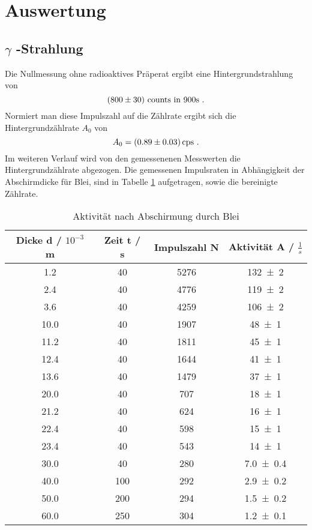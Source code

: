 \section{Auswertung}
\label{sec:Auswertung}
\subsection{\texorpdfstring{$\gamma$ -Strahlung }%
                               {gamma -Strahlung}}
Die Nullmessung ohne radioaktives Präperat ergibt eine Hintergrundstrahlung von
\begin{equation}
  (\num{800 +- 30}) \text{ counts in } 900 \text{s} \ .
  \label{eqn:gammacoun}
\end{equation}
Normiert man diese Impulszahl auf die Zählrate ergibt sich die Hintergrundzählrate $A_0$ von
\begin{equation}
  A_0 = (\num{0.89 +- 0.03}) \, \text{cps} \ .
  \label{eqn:A0}
\end{equation}
Im weiteren Verlauf wird von den gemessenenen Messwerten die Hintergrundzählrate abgezogen. Die gemessenen Impulsraten in Abhängigkeit der Abschirmdicke für Blei, sind in Tabelle \ref{tab:ABlei} aufgetragen, sowie die bereinigte Zählrate.
\begin{table}
  \centering
  \begin{tabular}{c c c c}
    \toprule
    Dicke d / $10^{-3}$ m & Zeit t / s & Impulszahl N & Aktivität A / $\frac{1}{s}$ \\
    \midrule
    	1.2	&40 	&5276	&\num{132 +- 2} 	\\
	2.4	&40 	&4776	&\num{119 +- 2}	\\
	3.6	&40 	&4259	&\num{106 +- 2}	\\
	10.0	&40 	&1907	&\num{48 +- 1}	\\
	11.2	&40 	&1811	&\num{45 +- 1}	\\
	12.4	&40 	&1644	&\num{41 +- 1}	\\
	13.6	&40 	&1479	&\num{37 +- 1}	\\
	20.0	&40 	&707	&\num{18 +- 1}	\\
	21.2	&40 	&624	&\num{16 +- 1}	\\
	22.4	&40 	&598	&\num{15 +- 1}	\\
	23.4	&40 	&543	&\num{14 +- 1}	\\
	30.0	&40 	&280	&\num{7.0 +- 0.4}	\\
	40.0	&100	&292	&\num{2.9 +- 0.2}	\\
	50.0	&200	&294	&\num{1.5 +- 0.2}	\\
	60.0	&250	&304	&\num{1.2 +- 0.1}	\\
    \bottomrule
  \end{tabular}
  \caption{Aktivität nach Abschirmung durch Blei}
  \label{tab:ABlei}
\end{table}
